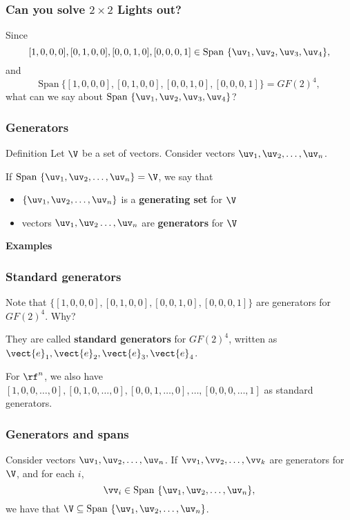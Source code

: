 \begin{frame}
  \frametitle{Can you solve $2\times 2$ Lights out?}

  Since
  \[
  [1,0,0,0], [0,1,0,0], [0,0,1,0], [0,0,0,1]\in {\mathrm{Span}}\ \{\uv_1,\uv_2,\uv_3,\uv_4\},
  \]
  and
  \pause
  \[
  \mathrm{Span}\ \{[1,0,0,0], [0,1,0,0], [0,0,1,0], [0,0,0,1]\} = GF(2)^4,
  \]
  \pause
  what can we say about ${\mathrm{Span}}\ \{\uv_1,\uv_2,\uv_3,\uv_4\}$?

\end{frame}


\begin{frame}
  \frametitle{Generators}

  \begin{block}{Definition}
    Let $\V$ be a set of vectors.  Consider vectors $\uv_1,\uv_2,\ldots,\uv_n$.

    If $\mathrm{Span}\ \{\uv_1,\uv_2,\ldots,\uv_n\} = \V$, we say that
    \begin{itemize}
    \item $\{\uv_1,\uv_2,\ldots,\uv_n\}$ is a {\bf generating set} for $\V$
    \item vectors $\uv_1,\uv_2\ldots,\uv_n$ are {\bf generators} for $\V$
    \end{itemize}
  \end{block}

  \pause

  {\bf Examples}
  \vspace{1.5in}
\end{frame}

\begin{frame}
  \frametitle{Standard generators}

  Note that $\{[1,0,0,0], [0,1,0,0], [0,0,1,0], [0,0,0,1]\}$ are
  generators for $GF(2)^4$.  Why?

  \vspace{0.5in}
  \pause

  They are called {\bf standard generators} for $GF(2)^4$, written as $\vect{e}_1,\vect{e}_2,\vect{e}_3,\vect{e}_4$.
  \pause

  \vspace{0.2in}

  For $\rf^n$, we also have
  $[1,0,0,\ldots,0],[0,1,0,\ldots,0],[0,0,1,\ldots,0],\ldots,[0,0,0,\ldots,1]$
  as standard generators.
  
\end{frame}

\begin{frame}
  \frametitle{Generators and spans}
  \begin{theorem}
    Consider vectors $\uv_1,\uv_2,\ldots,\uv_n$.
    If $\vv_1,\vv_2,\ldots,\vv_k$ are generators for $\V$, and for each $i$,
    \[
    \vv_i\in \mathrm{Span}\ \{\uv_1,\uv_2,\ldots,\uv_n\},
    \]
    we have that $\V \subseteq \mathrm{Span}\ \{\uv_1,\uv_2,\ldots,\uv_n\}$.
  \end{theorem}
\end{frame}

